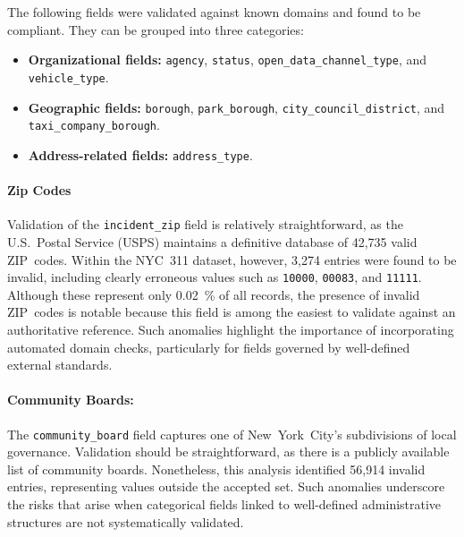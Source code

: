 \documentclass[linenumber]{jdsart}
\begin{document}
The following fields were validated against known domains and found to be 
compliant. They can be grouped into three categories:


\begin{itemize}[left=1.5em]
  \item \textbf{Organizational fields:} 
        \texttt{agency}, \texttt{status}, 
        \texttt{open\_data\_channel\_type}, and \texttt{vehicle\_type}.
  \item \textbf{Geographic fields:} 
        \texttt{borough}, \texttt{park\_borough}, 
        \texttt{city\_council\_district}, and \texttt{taxi\_company\_borough}.
  \item \textbf{Address-related fields:} 
        \texttt{address\_type}.
\end{itemize}

\paragraph{Zip Codes}
\label{par:zipcodesissues}
Validation of the \texttt{incident\_zip} field is relatively straightforward, 
as the U.S.~Postal Service (\textsc{USPS}) maintains a definitive database 
of 42{,}735 valid ZIP~codes. 
Within the NYC~311 dataset, however, 3{,}274 entries were found to be invalid, 
including clearly erroneous values such as \texttt{10000}, \texttt{00083}, 
and \texttt{11111}. 
Although these represent only \SI{0.02}{\percent} of all records, 
the presence of invalid ZIP~codes is notable because this field is among the 
easiest to validate against an authoritative reference. 
Such anomalies highlight the importance of incorporating automated domain 
checks, particularly for fields governed by well-defined external standards.

\paragraph{Community Boards:}
\label{sec:communityboardissues}
The \texttt{community\_board} field captures one of 
New~York~City’s subdivisions of local governance. 
Validation should be straightforward, as there is a publicly 
available list of community boards. 
Nonetheless, this analysis identified 56{,}914 invalid entries, 
representing values outside the accepted set. 
Such anomalies underscore the risks that arise when categorical fields 
linked to well-defined administrative structures are not systematically 
validated.


\end{document}
